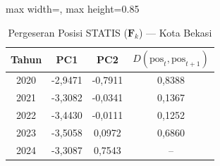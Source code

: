 \begin{table}[H]
\centering
\caption{Pergeseran Posisi STATIS ($\mathbf{F}_k$) --- Kota Bekasi} \label{tab:app2jarak_statis_skor_kota_bekasi}
\begin{adjustbox}{max width=\textwidth, max height=0.85\textheight}
\begin{tabular}{|c|c|c|c|}
\hline
\textbf{Tahun} & \textbf{PC1} & \textbf{PC2} & \textbf{$D(\text{pos}_t, \text{pos}_{t+1})$} \\
\hline
2020 & -2,9471 & -0,7911 & 0,8388 \\
2021 & -3,3082 & -0,0341 & 0,1367 \\
2022 & -3,4430 & -0,0111 & 0,1252 \\
2023 & -3,5058 & 0,0972 & 0,6860 \\
2024 & -3,3087 & 0,7543 & -- \\
\hline
\end{tabular}
\end{adjustbox}
\end{table}